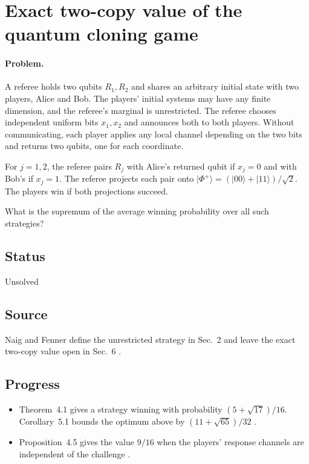 \section{Exact two-copy value of the quantum cloning game}
\label{sec:op_f92f25883c32f923}

\paragraph{Problem.}
A referee holds two qubits $R_1,R_2$ and shares an arbitrary initial state with two players, Alice and Bob. The players' initial systems may have any finite dimension, and the referee's marginal is unrestricted. The referee chooses independent uniform bits $x_1,x_2$ and announces both to both players. Without communicating, each player applies any local channel depending on the two bits and returns two qubits, one for each coordinate.

For $j=1,2$, the referee pairs $R_j$ with Alice's returned qubit if $x_j=0$ and with Bob's if $x_j=1$. The referee projects each pair onto $\lvert\Phi^+\rangle=(\lvert00\rangle+\lvert11\rangle)/\sqrt{2}$. The players win if both projections succeed.

What is the supremum of the average winning probability over all such strategies?

\subsection*{Status}

Unsolved

\subsection*{Source}

Naig and Fenner define the unrestricted strategy in Sec.~2 and leave the exact two-copy value open in Sec.~6 .

\subsection*{Progress}

\begin{itemize}
  \item Theorem~4.1 gives a strategy winning with probability $(5+\sqrt{17})/16$. Corollary~5.1 bounds the optimum above by $(11+\sqrt{65})/32$ .

  \item Proposition~4.5 gives the value $9/16$ when the players' response channels are independent of the challenge .
\end{itemize}

